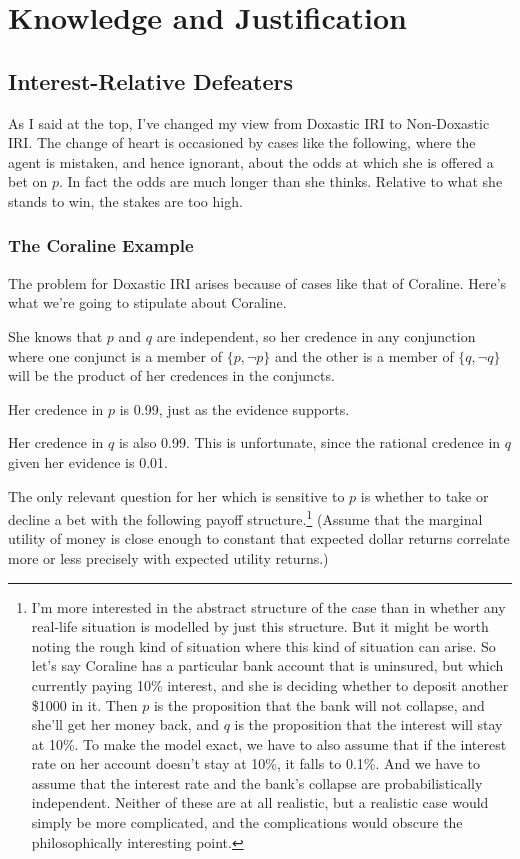 \chapter{Knowledge and Justification}

\section{Interest-Relative Defeaters}

As I said at the top, I've changed my view from Doxastic IRI to Non-Doxastic IRI. The change of heart is occasioned by cases like the following, where the agent is mistaken, and hence ignorant, about the odds at which she is offered a bet on $p$. In fact the odds are much longer than she thinks. Relative to what she stands to win, the stakes are too high.

\subsection{The Coraline Example}
The problem for Doxastic IRI arises because of cases like that of Coraline. Here's what we're going to stipulate about Coraline.

\begin{itemize*}
\item She knows that $p$ and $q$ are independent, so her credence in any conjunction where one conjunct is a member of  $\{p,  \neg p\}$ and the other is a member of $\{q, \neg q\}$ will be the product of her credences in the conjuncts.
\item Her credence in $p$ is 0.99, just as the evidence supports.
\item Her credence in $q$ is also 0.99. This is unfortunate, since the rational credence in $q$ given her evidence is 0.01.
\item The only relevant question for her which is sensitive to $p$ is whether to take or decline a bet with the following payoff structure.\footnote{I'm more interested in the abstract structure of the case than in whether any real-life situation is modelled by just this structure. But it might be worth noting the rough kind of situation where this kind of situation can arise. So let's say Coraline has a particular bank account that is uninsured, but which currently paying 10\% interest, and she is deciding whether to deposit another \$1000 in it. Then $p$ is the proposition that the bank will not collapse, and she'll get her money back, and $q$ is the proposition that the interest will stay at 10\%. To make the model exact, we have to also assume that if the interest rate on her account doesn't stay at 10\%, it falls to 0.1\%. And we have to assume that the interest rate and the bank's collapse are probabilistically independent. Neither of these are at all realistic, but a realistic case would simply be more complicated, and the complications would obscure the philosophically interesting point.} (Assume that the marginal utility of money is close enough to constant that expected dollar returns correlate more or less precisely with expected utility returns.)
\end{itemize*}

